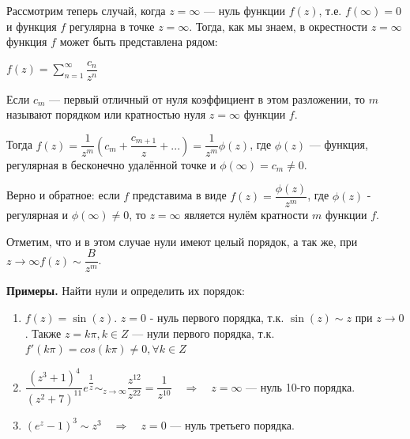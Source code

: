 \documentclass[a4paper, 12pt]{report}
\begin{document}
Рассмотрим теперь случай, когда $z = \infty$ --- нуль функции $f(z)$, т.е. $f(\infty) = 0$ и функция $f$ регулярна в точке $z = \infty$. Тогда, как мы знаем, в окрестности $z = \infty$ функция $f$ может быть представлена рядом:

\begin{center}
    $f(z) = \sum\limits_{n=1}^{\infty}\dfrac{c_n}{z^n}$
\end{center}

Если $c_m$ --- первый отличный от нуля коэффициент в этом разложении, то $m$ называют порядком или кратностью нуля $z = \infty$ функции $f$.

Тогда $f(z) = \dfrac{1}{z^m}(c_m + \dfrac{c_{m+1}}{z} + ...) = \dfrac{1}{z^m}\phi(z)$, где $\phi(z)$ --- функция, регулярная в бесконечно удалённой точке и $\phi(\infty) = c_m \ne 0$.

Верно и обратное: если $f$ представима в виде $f(z) = \dfrac{\phi(z)}{z^m}$, где $\phi(z)$ - регулярная и $\phi(\infty) \ne 0$, то $z = \infty$ является нулём кратности $m$ функции $f$.

Отметим, что и в этом случае нули имеют целый порядок, а так же, при $z \rightarrow \infty f(z) \sim \dfrac{B}{z^m}$.
\par\bigskip
\textbf{Примеры.} \quad Найти нули и определить их порядок:
\begin{enumerate}
    \item $f(z) = \sin(z)$. $z = 0$ - нуль первого порядка, т.к. $\sin(z) \sim z$ при $z \rightarrow0$. Также $z = k\pi, k \in Z$ --- нули первого порядка, т.к. $f'(k\pi) = cos(k\pi) \ne 0, \forall k \in Z$
    \item $\dfrac{(z^3 + 1)^4}{(z^2 + 7)^11}e^{\dfrac{1}{z}} \sim_{z \rightarrow \infty} \dfrac{z^{12}}{z^{22}} = \dfrac{1}{z^{10}} \quad \Rightarrow \quad z = \infty$ --- нуль 10-го порядка.
    \item $(e^z - 1)^3 \sim z^3 \quad \Rightarrow \quad z = 0$ --- нуль третьего порядка.
\end{enumerate}
\par\bigskip
\end{document}
